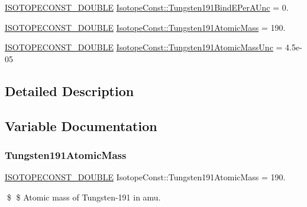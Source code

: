 \begin{DoxyCompactItemize}
\mbox{\hyperlink{group___isotope_const-_macros_ga8f45a7272ce02c0b4c65c44636ed719a}{I\+S\+O\+T\+O\+P\+E\+C\+O\+N\+S\+T\+\_\+\+D\+O\+U\+B\+LE}} \mbox{\hyperlink{group___isotope_const-_tungsten-_w191_ga0062cca32d76c5bd22e4daf4a68d681c}{Isotope\+Const\+::\+Tungsten191\+Bind\+E\+Per\+A\+Unc}} = 0.
\item 
\mbox{\hyperlink{group___isotope_const-_macros_ga8f45a7272ce02c0b4c65c44636ed719a}{I\+S\+O\+T\+O\+P\+E\+C\+O\+N\+S\+T\+\_\+\+D\+O\+U\+B\+LE}} \mbox{\hyperlink{group___isotope_const-_tungsten-_w191_gae10381ff058ec0bdbd380e90a24fbf07}{Isotope\+Const\+::\+Tungsten191\+Atomic\+Mass}} = 190.
\item 
\mbox{\hyperlink{group___isotope_const-_macros_ga8f45a7272ce02c0b4c65c44636ed719a}{I\+S\+O\+T\+O\+P\+E\+C\+O\+N\+S\+T\+\_\+\+D\+O\+U\+B\+LE}} \mbox{\hyperlink{group___isotope_const-_tungsten-_w191_ga0a9ff1537d02e228c9f17f53c6db9e30}{Isotope\+Const\+::\+Tungsten191\+Atomic\+Mass\+Unc}} = 4.\+5e-\/05
\end{DoxyCompactItemize}


\subsection{Detailed Description}


\subsection{Variable Documentation}
\mbox{\label{group___isotope_const-_tungsten-_w191_gae10381ff058ec0bdbd380e90a24fbf07}} 
\subsubsection{\texorpdfstring{Tungsten191\+Atomic\+Mass}{Tungsten191AtomicMass}}
{\footnotesize\ttfamily \mbox{\hyperlink{group___isotope_const-_macros_ga8f45a7272ce02c0b4c65c44636ed719a}{I\+S\+O\+T\+O\+P\+E\+C\+O\+N\+S\+T\+\_\+\+D\+O\+U\+B\+LE}} Isotope\+Const\+::\+Tungsten191\+Atomic\+Mass = 190.}

\$ \$ Atomic mass of Tungsten-\/191 in amu. \mbox{\label{group___isotope_const-_tungsten-_w191_ga0a9ff1537d02e228c9f17f53c6db9e30}} 
